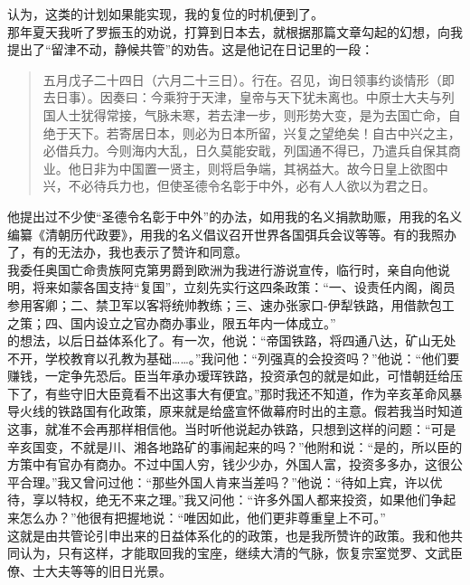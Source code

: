 认为，这类的计划如果能实现，我的复位的时机便到了。\\

那年夏天我听了罗振玉的劝说，打算到日本去，就根据那篇文章勾起的幻想，向我提出了“留津不动，静候共管”的劝告。这是他记在日记里的一段：\\

\begin{quote}
	五月戊子二十四日（六月二十三日）。行在。召见，询日领事约谈情形（即去日事）。因奏曰：今乘狩于天津，皇帝与天下犹未离也。中原士大夫与列国人士犹得常接，气脉未寒，若去津一步，则形势大变，是为去国亡命，自绝于天下。若寄居日本，则必为日本所留，兴复之望绝矣！自古中兴之主，必借兵力。今则海内大乱，日久莫能安戢，列国通不得已，乃遣兵自保其商业。他日非为中国置一贤主，则将启争端，其祸益大。故今日皇上欲图中兴，不必待兵力也，但使圣德令名彰于中外，必有人人欲以为君之日。\\
\end{quote}

他提出过不少使“圣德令名彰于中外”的办法，如用我的名义捐款助赈，用我的名义编纂《清朝历代政要》，用我的名义倡议召开世界各国弭兵会议等等。有的我照办了，有的无法办，我也表示了赞许和同意。\\

我委任奥国亡命贵族阿克第男爵到欧洲为我进行游说宣传，临行时，亲自向他说明，将来如蒙各国支持“复国”，立刻先实行这四条政策：“一、设责任内阁，阁员参用客卿；二、禁卫军以客将统帅教练；三、速办张家口-伊犁铁路，用借款包工之策；四、国内设立之官办商办事业，限五年内一体成立。”\\

的想法，以后日益体系化了。有一次，他说：“帝国铁路，将四通八达，矿山无处不开，学校教育以孔教为基础……。”我问他：“列强真的会投资吗？”他说：“他们要赚钱，一定争先恐后。臣当年承办瑷珲铁路，投资承包的就是如此，可惜朝廷给压下了，有些守旧大臣竟看不出这事大有便宜。”那时我还不知道，作为辛亥革命风暴导火线的铁路国有化政策，原来就是给盛宣怀做幕府时出的主意。假若我当时知道这事，就准不会再那样相信他。当时听他说起办铁路，只想到这样的问题：“可是辛亥国变，不就是川、湘各地路矿的事闹起来的吗？”他附和说：“是的，所以臣的方策中有官办有商办。不过中国人穷，钱少少办，外国人富，投资多多办，这很公平合理。”我又曾问过他：“那些外国人肯来当差吗？”他说：“待如上宾，许以优待，享以特权，绝无不来之理。”我又问他：“许多外国人都来投资，如果他们争起来怎么办？”他很有把握地说：“唯因如此，他们更非尊重皇上不可。”\\

这就是由共管论引申出来的日益体系化的的政策，也是我所赞许的政策。我和他共同认为，只有这样，才能取回我的宝座，继续大清的气脉，恢复宗室觉罗、文武臣僚、士大夫等等的旧日光景。\\

